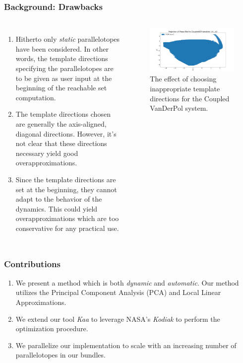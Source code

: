 \documentclass{beamer}
\begin{document}
\begin{frame}
  \frametitle{\textbf{Background:} Drawbacks}
    \begin{columns}
    \scriptsize
    \begin{enumerate}
      \item Hitherto only \emph{static} parallelotopes have been considered. In other words, the template directions specifying the parallelotopes are to be given as user input at the beginning of the reachable set computation.
      \item The template directions chosen are generally the axis-aligned, diagonal directions. However, it's not clear that these directions necessary yield good overapproximations.
      \item Since the template directions are set at the beginning, they cannot adapt to the behavior of the dynamics. This could yield overapproximations which are too conservative for any practical use.
    \end{enumerate}
    \begin{figure}
        \includegraphics[width=1.13\textwidth]{cvdp20}
        \caption{The effect of choosing inappropriate template directions for the Coupled VanDerPol system.}
      \end{figure}
  \end{columns}
\end{frame}

\begin{frame}
  \frametitle{Contributions}
  \begin{enumerate}
    \item We present a method which is both \emph{dynamic} and \emph{automatic}. Our method utilizes the Principal Component Analysis (PCA) and Local Linear Approximations.
    \item  We extend our tool \emph{Kaa} to leverage NASA's \emph{Kodiak} to perform the optimization procedure.
    \item We parallelize our implementation to scale with an increasing number of parallelotopes in our bundles.
  \end{enumerate}
\end{frame}
\end{document}
